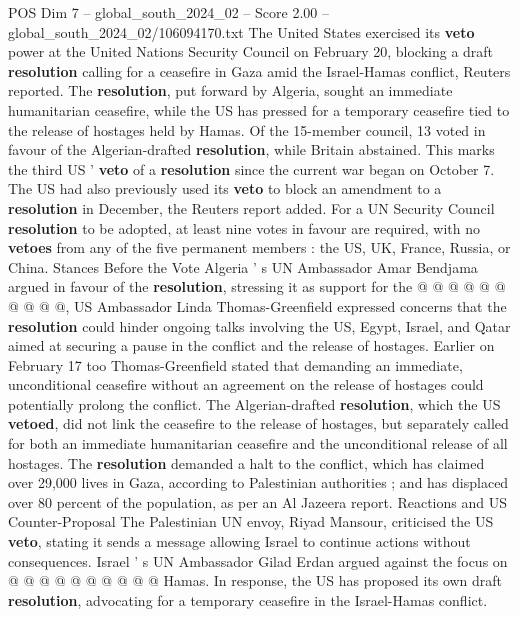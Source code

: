 \begin{textsample}{POS Dim 7 – global\_south\_2024\_02 – Score 2.00 – global\_south\_2024\_02/106094170.txt}  \label{ex:f7_pos_055}
The United States exercised its \textbf{veto} power at the United Nations Security Council on February 20, blocking a draft \textbf{resolution} calling for a ceasefire in Gaza amid the Israel-Hamas conflict, Reuters reported.
The \textbf{resolution}, put forward by Algeria, sought an immediate humanitarian ceasefire, while the US has pressed for a temporary ceasefire tied to the release of hostages held by Hamas.
Of the 15-member council, 13 voted in favour of the Algerian-drafted \textbf{resolution}, while Britain abstained.
This marks the third US ' \textbf{veto} of a \textbf{resolution} since the current war began on October 7.
The US had also previously used its \textbf{veto} to block an amendment to a \textbf{resolution} in December, the Reuters report added.
For a UN Security Council \textbf{resolution} to be adopted, at least nine votes in favour are required, with no \textbf{vetoes} from any of the five permanent members : the US, UK, France, Russia, or China.
Stances Before the Vote Algeria ' s UN Ambassador Amar Bendjama argued in favour of the \textbf{resolution}, stressing it as support for the @ @ @ @ @ @ @ @ @ @, US Ambassador Linda Thomas-Greenfield expressed concerns that the \textbf{resolution} could hinder ongoing talks involving the US, Egypt, Israel, and Qatar aimed at securing a pause in the conflict and the release of hostages.
Earlier on February 17 too Thomas-Greenfield stated that demanding an immediate, unconditional ceasefire without an agreement on the release of hostages could potentially prolong the conflict.
The Algerian-drafted \textbf{resolution}, which the US \textbf{vetoed}, did not link the ceasefire to the release of hostages, but separately called for both an immediate humanitarian ceasefire and the unconditional release of all hostages.
The \textbf{resolution} demanded a halt to the conflict, which has claimed over 29,000 lives in Gaza, according to Palestinian authorities ; and has displaced over 80 percent of the population, as per an Al Jazeera report.
Reactions and US Counter-Proposal The Palestinian UN envoy, Riyad Mansour, criticised the US \textbf{veto}, stating it sends a message allowing Israel to continue actions without consequences.
Israel ' s UN Ambassador Gilad Erdan argued against the focus on @ @ @ @ @ @ @ @ @ @ Hamas.
In response, the US has proposed its own draft \textbf{resolution}, advocating for a temporary ceasefire in the Israel-Hamas conflict.

\end{textsample}
